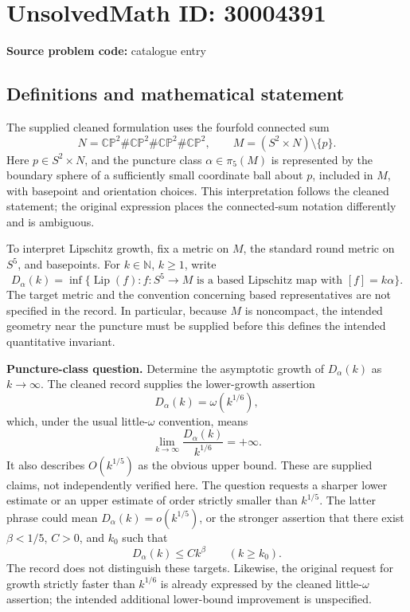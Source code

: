 \documentclass[11pt]{article}
\newcommand{\N}{\mathbb{N}}
\begin{document}
\section*{UnsolvedMath ID: 30004391}
\textbf{Source problem code:} catalogue entry
\subsection{Definitions and mathematical statement}
The supplied cleaned formulation uses the fourfold connected sum
\[
N=\mathbb{CP}^{2}\#\mathbb{CP}^{2}\#\mathbb{CP}^{2}\#\mathbb{CP}^{2},\qquad M=(S^{2}\times N)\setminus\{p\}.
\]
Here \(p\in S^{2}\times N\), and the puncture class \(\alpha\in\pi_{5}(M)\) is represented by the boundary sphere of a sufficiently small coordinate ball about \(p\), included in \(M\), with basepoint and orientation choices. This interpretation follows the cleaned statement; the original expression places the connected-sum notation differently and is ambiguous.

To interpret Lipschitz growth, fix a metric on \(M\), the standard round metric on \(S^{5}\), and basepoints. For \(k\in\N\), \(k\geq1\), write
\[
D_{\alpha}(k)=\inf\{\operatorname{Lip}(f):f:S^{5}\to M\text{ is a based Lipschitz map with }[f]=k\alpha\}.
\]
The target metric and the convention concerning based representatives are not specified in the record. In particular, because \(M\) is noncompact, the intended geometry near the puncture must be supplied before this defines the intended quantitative invariant.

\textbf{Puncture-class question.} Determine the asymptotic growth of \(D_{\alpha}(k)\) as \(k\to\infty\). The cleaned record supplies the lower-growth assertion
\[
D_{\alpha}(k)=\omega(k^{1/6}),
\]
which, under the usual little-\(\omega\) convention, means
\[
\lim_{k\to\infty}\frac{D_{\alpha}(k)}{k^{1/6}}=+\infty.
\]
It also describes \(O(k^{1/5})\) as the obvious upper bound. These are supplied claims, not independently verified here. The question requests a sharper lower estimate or an upper estimate of order strictly smaller than \(k^{1/5}\). The latter phrase could mean \(D_{\alpha}(k)=o(k^{1/5})\), or the stronger assertion that there exist \(\beta<1/5\), \(C>0\), and \(k_{0}\) such that
\[
D_{\alpha}(k)\leq Ck^{\beta}\qquad(k\geq k_{0}).
\]
The record does not distinguish these targets. Likewise, the original request for growth strictly faster than \(k^{1/6}\) is already expressed by the cleaned little-\(\omega\) assertion; the intended additional lower-bound improvement is unspecified.
\end{document}
